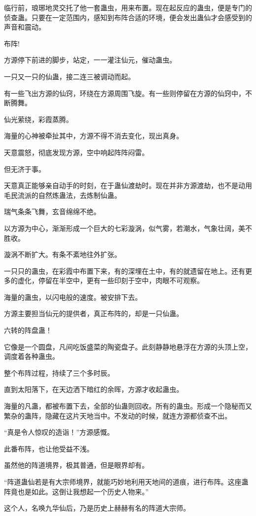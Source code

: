 \begin{this_body}
临行前，琅琊地灵交托了他一套蛊虫，用来布置。现在起反应的蛊虫，便是专门的侦查蛊。只要在一定范围内，感知到布阵合适的环境，便会发出蛊仙才会感受到的声音和震动。

布阵!

方源停下前进的脚步，站定，一一灌注仙元，催动蛊虫。

一只又一只的仙蛊，接二连三被调动而起。

有一些飞出方源的仙窍，环绕在方源周围飞旋。有一些则停留在方源的仙窍中，不断腾舞。

仙光萦绕，彩霞蒸腾。

海量的心神被牵扯其中，方源不得不消去变化，现出真身。

天意震怒，彻底发现方源，空中响起阵阵闷雷。

但无济于事。

天意真正能够亲自动手的时刻，在于蛊仙渡劫时。现在并非方源渡劫，也不是动用毛民流派的自然炼蛊法，去炼制仙蛊。

瑞气条条飞舞，玄音绵绵不绝。

以方源为中心，渐渐形成一个巨大的七彩漩涡，似气雾，若潮水，气象壮阔，美不胜收。

漩涡不断扩大。有条不紊地往外扩张。

一只只的蛊虫，在彩霞中布置下来，有的深埋在土中，有的就遗留在地上。还有更多的虚化，停留在半空中，更有一些印刻于空中，肉眼不可观察。

海量的蛊虫，以闪电般的速度。被安排下去。

方源主要担当仙元的提供者，真正布阵的，却是一只仙蛊。

六转的阵盘蛊！

它像是一个圆盘，凡间吃饭盛菜的陶瓷盘子。此刻静静地悬浮在方源的头顶上空，调度着各种蛊虫。

整个布阵过程，持续了三个多时辰。

直到太阳落下，在天边洒下暗红的余晖，方源才收起蛊虫。

海量的凡蛊，都被布置下去，全部的仙蛊则回收。所有的蛊虫。形成一个隐秘而又繁杂的蛊阵，隐藏在这片天地当中。不发动的时候，就连方源都侦查不出。

“真是令人惊叹的造诣！”方源感慨。

此番布阵，也让他受益不浅。

虽然他的阵道境界，极其普通，但是眼界却有。

“阵道蛊仙若是有大宗师境界，就能巧妙地利用天地间的道痕，进行布阵。这座蛊阵竟也是如此。这倒让我想起一个历史人物来。”

这个人，名唤九华仙后，乃是历史上赫赫有名的阵道大宗师。


\end{this_body}
